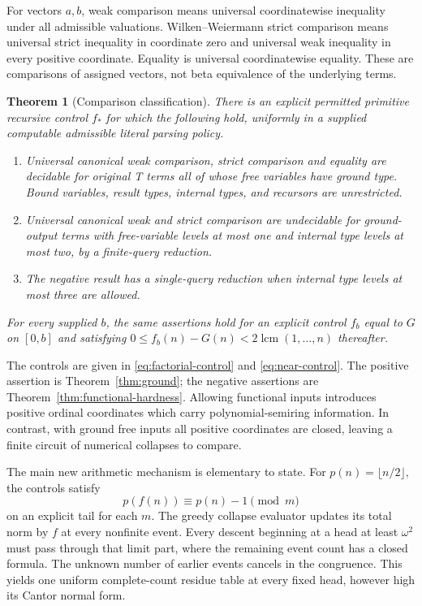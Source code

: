 \documentclass[11pt,a4paper]{article}
\numberwithin{equation}{section}
\newtheorem{theorem}{Theorem}[section]
\theoremstyle{definition}
\theoremstyle{remark}
\begin{document}
For vectors \(a,b\), weak comparison means universal coordinatewise
inequality under all admissible valuations. Wilken--Weiermann strict
comparison means universal strict inequality in coordinate zero and
universal weak inequality in every positive coordinate. Equality is
universal coordinatewise equality. These are comparisons of assigned
vectors, not beta equivalence of the underlying terms.

\begin{theorem}[Comparison classification]\label{thm:main}
There is an explicit permitted primitive recursive control \(f_*\) for
which the following hold, uniformly in a supplied computable admissible
literal parsing policy.
\begin{enumerate}[label=(\roman*)]
\item Universal canonical weak comparison, strict comparison and equality
are decidable for original T terms all of whose free variables have ground
type. Bound variables, result types, internal types, and recursors are
unrestricted.
\item Universal canonical weak and strict comparison are undecidable for
ground-output terms with free-variable levels at most one and internal
type levels at most two, by a finite-query reduction.
\item The negative result has a single-query reduction when internal
type levels at most three are allowed.
\end{enumerate}
For every supplied \(b\), the same assertions hold for an explicit
control \(f_b\) equal to \(G\) on \([0,b]\) and satisfying
\(0\le f_b(n)-G(n)<2\operatorname{lcm}(1,\ldots,n)\) thereafter.
\end{theorem}

The controls are given in \eqref{eq:factorial-control} and
\eqref{eq:near-control}. The positive assertion is
Theorem~\ref{thm:ground}; the negative assertions are
Theorem~\ref{thm:functional-hardness}. Allowing functional inputs
introduces positive ordinal coordinates which carry polynomial-semiring
information. In contrast, with ground free inputs all positive coordinates
are closed, leaving a finite circuit of numerical collapses to compare.

The main new arithmetic mechanism is elementary to state. For
\(p(n)=\lfloor n/2\rfloor\), the controls satisfy
\[
 p(f(n))\equiv p(n)-1\pmod m
\]
on an explicit tail for each \(m\). The greedy collapse evaluator updates
its total norm by \(f\) at every nonfinite event. Every descent beginning
at a head at least \(\omega^2\) must pass through that limit part,
where the remaining event count has a closed formula. The unknown number
of earlier events cancels in the congruence. This yields one uniform
complete-count residue table at every fixed head, however high its
Cantor normal form.
\end{document}
